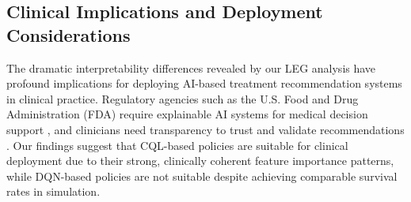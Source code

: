\subsection{Clinical Implications and Deployment Considerations}\label{sec:discussion:clinical}

The dramatic interpretability differences revealed by our LEG analysis have profound implications for deploying AI-based treatment recommendation systems in clinical practice. Regulatory agencies such as the U.S. Food and Drug Administration (FDA) require explainable AI systems for medical decision support \citep{holzinger2017xai_healthcare}, and clinicians need transparency to trust and validate recommendations \citep{gottesman2019guidelines}. Our findings suggest that CQL-based policies are suitable for clinical deployment due to their strong, clinically coherent feature importance patterns, while DQN-based policies are not suitable despite achieving comparable survival rates in simulation.

